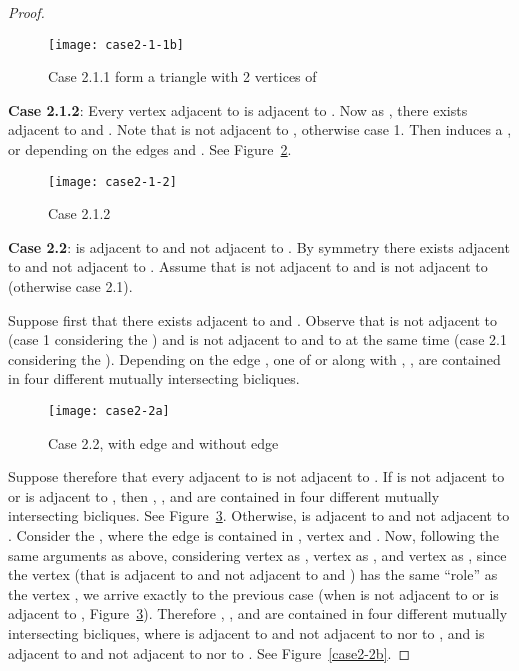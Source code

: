 \documentclass[12pt]{article}
\begin{document}
\begin{proof}
\FloatBarrier
\begin{figure}[h]
	\centering
	\texttt{[image: case2-1-1b]}
	\caption{Case 2.1.1  form a  triangle with 2 vertices of }
	\label{case2-1-1b}
\end{figure}
\FloatBarrier

\textbf{Case  2.1.2}: Every vertex    adjacent to   is
adjacent  to .   Now as  , there  exists 
adjacent  to   and  .  Note  that   is  not  adjacent to  ,
otherwise case 1.  Then  induces a ,  or
 depending on the edges  and . See Figure~\ref{case2-1-2}.


\begin{figure}[ht!]
	\centering
	\texttt{[image: case2-1-2]}
	\caption{Case 2.1.2}
	\label{case2-1-2}
\end{figure}


\textbf{Case 2.2}:   is adjacent to   and not adjacent  to . By
symmetry there  exists   adjacent to  and  not adjacent to
.  Assume that  is not adjacent  to  and  is not adjacent to
 (otherwise case 2.1).

Suppose first  that there  exists  adjacent  to   and .
Observe  that   is  not  adjacent  to    (case 1  considering  the
) and  is  not adjacent to  and to   at the same
time (case 2.1 considering the ). Depending on the edge
,  one  of    or   along  with  ,
,   are contained  in four  different mutually
intersecting bicliques.



\begin{figure}[ht!]    
	\centering
	\texttt{[image: case2-2a]}
	\caption{Case 2.2, with edge  and without edge }
	\label{case2-2a}
\end{figure}

Suppose therefore that every  adjacent to  is not adjacent
to .  If  is not adjacent to  or  is  adjacent to , then
,  ,    and      are
contained  in  four  different  mutually  intersecting  bicliques.   See
Figure~\ref{case2-2a}. Otherwise,  is adjacent  to  and not  adjacent to .
Consider the , where the edge  is contained in
, vertex  and .  Now, following the same
arguments as above, considering vertex  as , vertex  as , and
vertex  as , since the vertex  (that is adjacent to
 and not adjacent to  and ) has the same ``role'' as the vertex , we arrive exactly to the previous case (when  is not adjacent to 
 or  is adjacent to , Figure~\ref{case2-2a}).
Therefore , ,  and  are contained in four different mutually intersecting bicliques, 
where  is adjacent to   and not adjacent to  nor to , and  is
adjacent   to    and  not   adjacent   to     nor  to   . See Figure~\ref{case2-2b}.


\end{proof}
\end{document}
